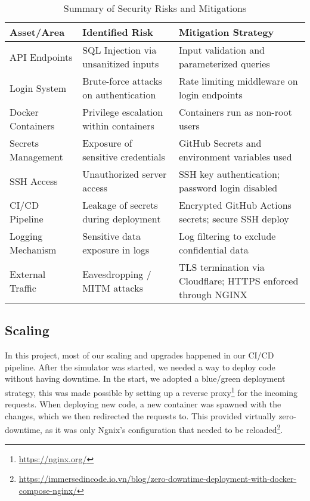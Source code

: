 \begin{table}[H]
\centering
\renewcommand{\arraystretch}{1.4}
\begin{tabular}{|>{\centering\arraybackslash}p{3.5cm}|>{\centering\arraybackslash}p{6cm}|>{\centering\arraybackslash}p{6cm}|}
\hline
\textbf{Asset/Area} & \textbf{Identified Risk} & \textbf{Mitigation Strategy} \\
\hline
API Endpoints & SQL Injection via unsanitized inputs & Input validation and parameterized queries \\
\hline
\color{red}Login System & \color{red} Brute-force attacks on authentication & \color{red} Rate limiting middleware on login endpoints \\
\hline
\color{red} Docker Containers & \color{red} Privilege escalation within containers & \color{red} Containers run as non-root users \\
\hline
Secrets Management & Exposure of sensitive credentials & GitHub Secrets and environment variables used \\
\hline
SSH Access & Unauthorized server access & SSH key authentication; password login disabled \\
\hline
CI/CD Pipeline & Leakage of secrets during deployment & Encrypted GitHub Actions secrets; secure SSH deploy \\
\hline
Logging Mechanism & Sensitive data exposure in logs & Log filtering to exclude confidential data \\
\hline
External Traffic & Eavesdropping / MITM attacks & TLS termination via Cloudflare; HTTPS enforced through NGINX \\
\hline
\end{tabular}
\caption{Summary of Security Risks and Mitigations}
\end{table}



\subsection{Scaling}
In this project, most of our scaling and upgrades happened in our CI/CD pipeline. After the simulator was started, we needed a way to deploy code without having downtime. In the start, we adopted a blue/green deployment strategy, this was made possible by setting up a reverse proxy\footnote{\url{https://nginx.org/}} for the incoming requests. When deploying new code, a new container was spawned with the changes, which we then redirected the requests to. This provided virtually zero-downtime, as it was only Ngnix's configuration that needed to be reloaded\footnote{\url{https://immersedincode.io.vn/blog/zero-downtime-deployment-with-docker-compose-nginx/}}.
\\

